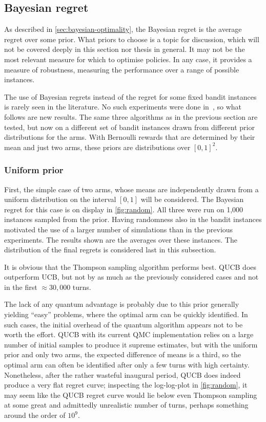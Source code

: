 \clearpage
\subsection{Bayesian regret}
\label{sec:results_bayesian}
As described in \cref{sec:bayesian-optimality}, the Bayesian regret is the average regret over some prior.
What priors to choose is a topic for discussion, which will not be covered deeply in this section nor thesis in general.
It may not be the most relevant measure for which to optimise policies.
In any case, it provides a measure of robustness, measuring the performance over a range of possible instances.

The use of Bayesian regrets instead of the regret for some fixed bandit instances is rarely seen in the literature.
No such experiments were done in~\autocite{wan2022}, so what follows are new results.
The same three algorithms as in the previous section are tested, but now on a different set of bandit instances drawn from different prior distributions for the arms.
With Bernoulli rewards that are determined by their mean and just two arms, these priors are distributions over $[0, 1]^2$.


\subsubsection{Uniform prior}
First, the simple case of two arms, whose means are independently drawn from a uniform distribution on the interval $[0, 1]$ will be considered.
The Bayesian regret for this case is on display in \cref{fig:random}.
All three were run on 1,000 instances sampled from the prior.
Having randomness also in the bandit instances motivated the use of a larger number of simulations than in the previous experiments.
The results shown are the averages over these instances.
The distribution of the final regrets is considered last in this subsection.

It is obvious that the Thompson sampling algorithm performs best.
QUCB does outperform UCB, but not by as much as the previously considered cases and not in the first $\approx 30,000$ turns.

The lack of any quantum advantage is probably due to this prior generally yielding \enquote{easy} problems, where the optimal arm can be quickly identified.
In such cases, the initial overhead of the quantum algorithm appears not to be worth the effort.
QUCB with its current QMC implementation relies on a large number of initial samples to produce it supreme estimates, but with the uniform prior and only two arms, the expected difference of means is a third, so the optimal arm can often be identified after only a few turns with high certainty.
Nonetheless, after the rather wasteful inaugural period, QUCB does indeed produce a very flat regret curve; inspecting the log-log-plot in \cref{fig:random}, it may seem like the QUCB regret curve would lie below even Thompson sampling at some great and admittedly unrealistic number of turns, perhaps something around the order of $10^{9}$.



